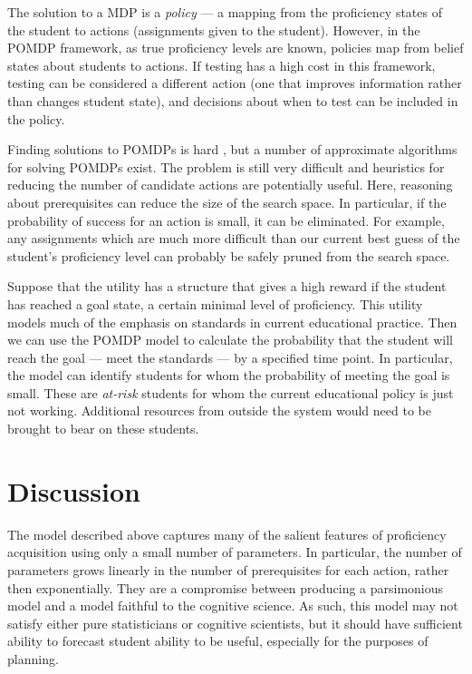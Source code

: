 \documentclass[12pt]{RR-article}
\begin{document}
The solution to a MDP is a \textit{policy\/} --- a mapping from
the proficiency states of the student to actions (assignments given to
the student).  However, in the POMDP framework, as true proficiency
levels are known, policies map from belief states about students to
actions.  If testing has a high cost in this framework, testing can be
considered a different action (one that improves information rather
than changes student state), and decisions about when to test can be
included in the policy.

Finding solutions to POMDPs is hard \cite{Mundhenk2000}, but a number
of approximate algorithms for solving POMDPs exist.  The problem is
still very difficult and heuristics for reducing the number of
candidate actions are potentially useful.  Here, reasoning about
prerequisites can reduce the size of the search space.  In
particular, if the probability of success for an action is small, it
can be eliminated.  For example, any assignments
which are much more difficult than our current best guess of the
student's proficiency level can probably be safely pruned from the
search space.

Suppose that the utility has a structure that gives a high reward if
the student has reached a goal state, a certain minimal level of
proficiency.  This utility models much of the emphasis on standards in
current educational practice.  Then we can use the POMDP model to
calculate the probability that the student will reach the goal --- meet
the standards --- by a specified time point.  In particular, the model
can identify students for whom the probability of meeting the goal
is small.  These are \textit{at-risk\/} students for whom the
current educational policy is just not working.  Additional resources
from outside the system would need to be brought to bear on these
students.

\section{Discussion}

The model described above captures many of the salient features of
proficiency acquisition using only a small number of parameters.  In
particular, the number of parameters grows linearly in the number of
prerequisites for each action, rather then exponentially.  They are a
compromise between producing a parsimonious model and a model faithful
to the cognitive science.  As such, this model may not satisfy either pure
statisticians or cognitive scientists, but it should have sufficient
ability to forecast student ability to be useful, especially for the
purposes of planning.
\end{document}
